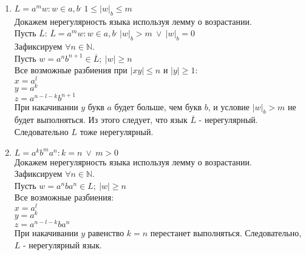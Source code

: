\documentclass[12pt]{article}
\begin{document}
\begin{enumerate}
     \item $L = { a^mw : w \in {a, b}^,\ 1\leq |w|_b \leq m }$\\
    Докажем нерегулярность языка используя лемму о возрастании.\\
    Пусть $\overline{L}$:
    $\overline{L} = { a^mw : w \in {a, b}^,\ |w|_b > m\ \lor\ |w|_b=0}$\\
    Зафиксируем $\forall n \in \mathbb{N} $. \\
    Пусть $w=a^nb^{n+1} \in \overline{L};\ |w| \geq n$\\
    Все возможные разбиения при $|xy| \leq n$ и $|y| \geq 1$:\\
    $x=a^l$\\
    $y=a^k$\\
    $z=a^{n-l-k}b^{n+1}$\\
    При накачивании $y$ букв $a$ будет больше, чем букв $b$, и  условие $|w|_b > m$ не будет выполняться. Из этого следует, что язык $\overline{L}$ - нерегулярный. Следовательно $L$ тоже нерегулярный.
    
    
    \item $L = { a^kb^ma^n : k = n\ \lor\ m > 0}$\\
    Докажем нерегулярность языка используя лемму о возрастании.\\
    Зафиксируем $\forall n \in \mathbb{N} $. \\
    Пусть $w=a^nba^n \in L;\ |w| \geq n$\\
    Все возможные разбиения:\\
    $x=a^l$\\
    $y=a^k$\\
    $z=a^{n-l-k}ba^n$\\
    При накачивании $y$ равенство $k=n$ перестанет выполняться. Следовательно, $L$ - нерегулярный язык.
    
    \end{enumerate}
\end{document}
